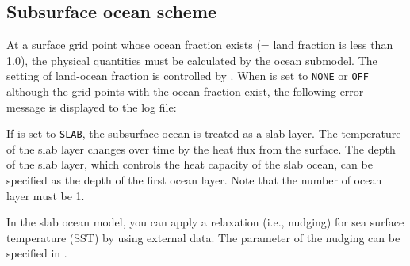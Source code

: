 \subsection{Subsurface ocean scheme}

At a surface grid point whose ocean fraction exists (= land fraction is less than 1.0),
the physical quantities must be calculated by the ocean submodel.
The setting of land-ocean fraction is controlled by .
When  is set to \verb|NONE| or \verb|OFF| although the grid points with the ocean fraction exist, the following error message is displayed to the log file:


If  is set to \verb|SLAB|, the subsurface ocean is treated as a slab layer.
The temperature of the slab layer changes over time by the heat flux from the surface.
The depth of the slab layer, which controls the heat capacity of the slab ocean, can be specified as the depth of the first ocean layer.
Note that the number of ocean layer must be 1.


In the slab ocean model, you can apply a relaxation (i.e., nudging) for sea surface temperature (SST)
by using external data.
The parameter of the nudging can be specified in .


